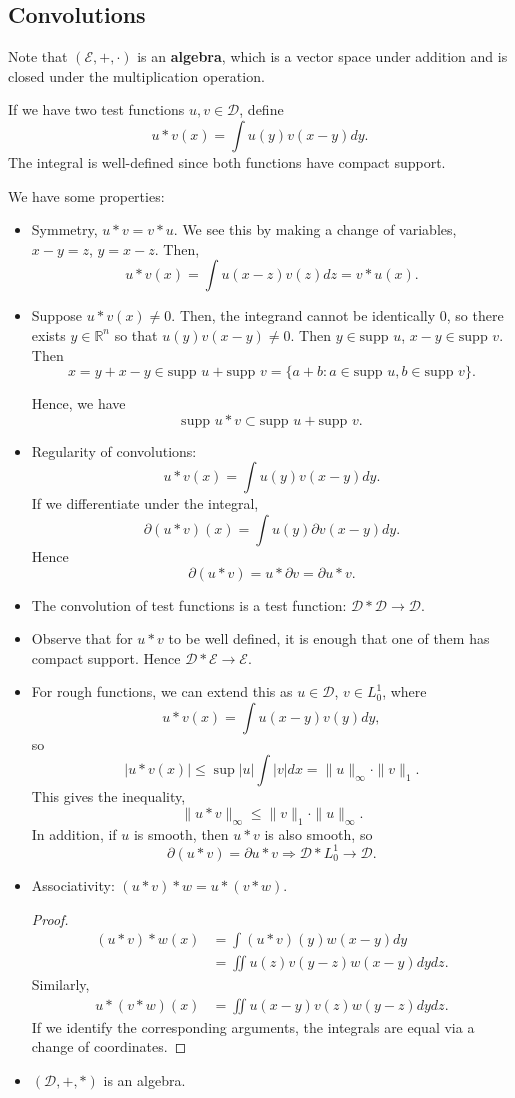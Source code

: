 \documentclass[12pt]{scrartcl}
\newcommand{\R}{\mathbb{R}}
\newcommand{\supp}{\text{supp }}
\begin{document}
\subsection{Convolutions}
Note that $(\mathcal E, +, \cdot)$ is an \textbf{algebra}, which is a vector space under addition and is closed under the multiplication operation.

If we have two test functions $u, v \in \mathcal D$, define $$u * v (x) = \int u(y)v(x-y) dy.$$
The integral is well-defined since both functions have compact support.

We have some properties:
\begin{itemize}
\item Symmetry, $u * v = v * u$.  We see this by making a change of variables, $x-y = z$, $y = x-z$.  Then,
$$u * v(x) = \int u(x-z)v(z)dz  = v*u(x).$$
\item Suppose $u *v (x) \ne 0$.  Then, the integrand cannot be identically $0$, so there exists $y \in \R^n$ so that $u(y)v(x-y) \ne 0$.  Then $y \in \supp u$, $x-y \in \supp v$.  Then $$x = y + x-y \in \supp u + \supp v = \{a + b : a \in \supp u, b \in \supp v\}.$$

Hence, we have $$\supp u*v \subset \supp u + \supp v.$$
\item Regularity of convolutions:
$$u * v(x) = \int u(y)v(x-y)dy.$$
If we differentiate under the integral, 
$$\partial(u * v)(x) = \int u(y) \partial v(x-y)dy.$$
Hence $$\partial(u*v) = u * \partial v = \partial u * v.$$
\item The convolution of test functions is a test function: $\mathcal D * \mathcal D \rightarrow \mathcal D$.  \item Observe that for $u*v$ to be well defined, it is enough that one of them has compact support.  Hence $\mathcal D * \mathcal E \rightarrow \mathcal E$.                                       
\item For rough functions, we can extend this as $u \in \mathcal D$, $v \in L_0^1$, where 
$$u * v(x) = \int u(x-y)v(y)dy,$$
so $$|u*v(x)| \le \sup |u|\int |v|dx = \|u\|_\infty \cdot  \|v\|_1.$$
This gives the inequality,
$$\|u*v\|_\infty\le \|v\|_1 \cdot \|u\|_\infty.$$
In addition, if $u$ is smooth, then $u*v$ is also smooth, so 
$$\partial(u*v) = \partial u * v \Rightarrow \mathcal D * L_0^1 \rightarrow \mathcal D.$$
\item Associativity: $(u*v)*w = u*(v*w)$.    
\begin{proof}
\begin{align*}
(u*v)*w(x) &= \int(u*v)(y) w(x-y)dy \\
&=\iint u(z) v(y-z) w(x-y)dydz.
\end{align*}
Similarly,
\begin{align*}
u*(v*w)(x) &= \iint u(x-y)v(z)w(y-z) dydz.
\end{align*}
If we identify the corresponding arguments, the integrals are equal via a change of coordinates.
\end{proof}
\item $(\mathcal D, +, *)$ is an algebra.
\end{itemize}
\end{document}
